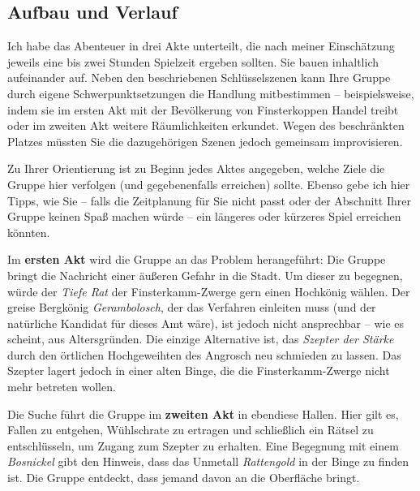 \subsection{Aufbau und Verlauf}
Ich habe das Abenteuer in drei Akte unterteilt, die nach meiner Einschätzung jeweils eine bis zwei Stunden Spielzeit ergeben sollten.
Sie bauen inhaltlich aufeinander auf.
Neben den beschriebenen Schlüsselszenen kann Ihre Gruppe durch eigene Schwerpunktsetzungen die Handlung mitbestimmen -- beispielsweise,
indem sie im ersten Akt mit der Bevölkerung von Finsterkoppen Handel treibt oder im zweiten Akt weitere Räumlichkeiten erkundet.
Wegen des beschränkten Platzes müssten Sie die dazugehörigen Szenen jedoch gemeinsam improvisieren.

Zu Ihrer Orientierung ist zu Beginn jedes Aktes angegeben, welche Ziele die Gruppe hier verfolgen (und gegebenenfalls erreichen) sollte.
Ebenso gebe ich hier Tipps, wie Sie -- falls die Zeitplanung für Sie nicht passt  oder der Abschnitt Ihrer Gruppe keinen Spaß machen würde -- ein längeres oder kürzeres Spiel erreichen könnten.

Im \textbf{ersten Akt} wird die Gruppe an das Problem herangeführt:
Die Gruppe bringt die Nachricht einer äußeren Gefahr in die Stadt.
Um dieser zu begegnen, würde der \emph{Tiefe Rat} der Finsterkamm-Zwerge gern einen Hochkönig wählen.
Der greise Bergkönig \emph{Gerambolosch}, der das Verfahren einleiten muss (und der natürliche Kandidat für dieses Amt wäre), ist jedoch nicht ansprechbar -- wie es scheint, aus Altersgründen.
Die einzige Alternative ist, das \emph{Szepter der Stärke} durch den örtlichen Hochgeweihten des Angrosch neu schmieden zu lassen.
Das Szepter lagert jedoch in einer alten Binge, die die Finsterkamm-Zwerge nicht mehr betreten wollen.


Die Suche führt die Gruppe im \textbf{zweiten Akt} in ebendiese Hallen.
Hier gilt es, Fallen zu entgehen, Wühlschrate zu ertragen und schließlich ein Rätsel zu entschlüsseln, um Zugang zum Szepter zu erhalten.
Eine Begegnung mit einem \emph{Bosnickel} gibt den Hinweis, dass das Unmetall \emph{Rattengold} in der Binge zu finden ist. Die Gruppe entdeckt, dass jemand davon an die Oberfläche bringt.

